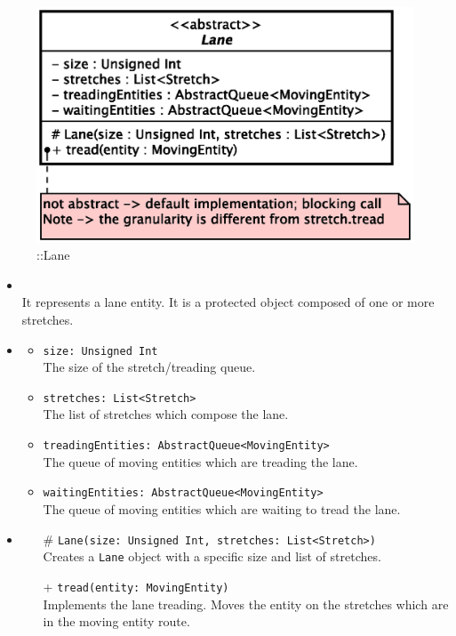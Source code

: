 \begin{figure}[h]
\centering
\includegraphics[scale=0.6,keepaspectratio]{images/solution/app/backend/lane.eps}
\caption{\pReactiveComponentLane::Lane}
\label{fig:sd-app-lane}
\end{figure}
\FloatBarrier
\begin{itemize}
  \item \textbf{\descr} \\
    It represents a lane entity. It is a protected object composed of one or
    more stretches.
  \item \textbf{\attrs}
  \begin{itemize}
    \item \texttt{size: Unsigned Int} \\
The size of the stretch/treading queue.
    \item \texttt{stretches: List<Stretch>} \\
The list of stretches which compose the lane.
    \item \texttt{treadingEntities: AbstractQueue<MovingEntity>} \\
The queue of moving entities which are treading the lane.
    \item \texttt{waitingEntities: AbstractQueue<MovingEntity>} \\
The queue of moving entities which are waiting to tread the lane. 
  \end{itemize}
  \item \textbf{\ops}
  \begin{itemize} 
    \item[\#] \texttt{Lane(size: Unsigned Int, stretches: List<Stretch>)} \\
Creates a \texttt{Lane} object with a specific size and list of stretches.
    \item[+] \texttt{tread(entity: MovingEntity)} \\
Implements the lane treading. Moves the entity on the stretches which are 
in the moving entity route.
  \end{itemize}
\end{itemize}
